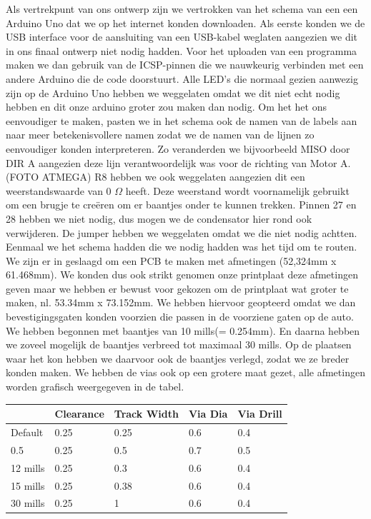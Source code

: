 Als vertrekpunt van ons ontwerp zijn we vertrokken van het schema van een een Arduino Uno dat we op het internet konden downloaden. Als eerste konden we de USB interface voor de aansluiting van een USB-kabel weglaten aangezien we dit in ons finaal ontwerp niet nodig hadden. Voor het uploaden van een programma maken we dan gebruik van de ICSP-pinnen die we nauwkeurig verbinden met een andere Arduino die de code doorstuurt.  Alle LED's die normaal gezien aanwezig zijn op de Arduino Uno hebben we  weggelaten omdat we dit niet echt nodig hebben en dit onze arduino groter zou maken dan nodig. Om het het ons eenvoudiger te maken, pasten we in het schema ook de namen van de labels aan naar meer betekenisvollere namen zodat we de namen van de lijnen zo eenvoudiger konden interpreteren. Zo veranderden we bijvoorbeeld MISO door DIR A aangezien deze lijn verantwoordelijk was voor de richting van Motor A. (FOTO ATMEGA) R8 hebben we ook weggelaten aangezien dit een weerstandswaarde van 0 $\Omega$ heeft. Deze weerstand wordt voornamelijk gebruikt om een brugje te cre\"eren om er baantjes onder te kunnen trekken. Pinnen 27 en 28 hebben we niet nodig, dus mogen we de condensator hier rond ook verwijderen. De jumper hebben we weggelaten omdat we die niet nodig achtten. Eenmaal we het schema hadden die we nodig hadden was het tijd om te routen. We zijn er in geslaagd om een PCB te maken met afmetingen (52,324mm x 61.468mm). We konden dus ook strikt genomen onze printplaat deze afmetingen geven maar we hebben er bewust voor gekozen om de printplaat wat groter te maken, nl.  53.34mm x 73.152mm. We hebben hiervoor geopteerd omdat we dan bevestigingsgaten konden voorzien die passen in de voorziene gaten op de auto. We hebben begonnen met baantjes van 10 mills(= 0.254mm). En daarna hebben we zoveel mogelijk de baantjes verbreed tot maximaal 30 mills. Op de plaatsen waar het kon hebben we daarvoor ook de baantjes verlegd, zodat we ze breder konden maken. We hebben de vias ook op een grotere maat gezet, alle afmetingen worden grafisch weergegeven in de tabel.\\
\begin{center}
	\begin{tabular}{ | l | l | l | l | l |}
	\hline
	  & Clearance & Track Width & Via Dia & Via Drill\\ \hline
	Default & 0.25 & 0.25 & 0.6 & 0.4\\ \hline
	0.5 & 0.25 & 0.5 & 0.7 & 0.5 \\ \hline
	12 mills & 0.25 & 0.3 & 0.6 & 0.4 \\ \hline
	15 mills & 0.25 & 0.38 & 0.6 & 0.4 \\ \hline
	30 mills & 0.25 & 1 & 0.6 & 0.4 \\ \hline
	\end{tabular}
\end{center}
